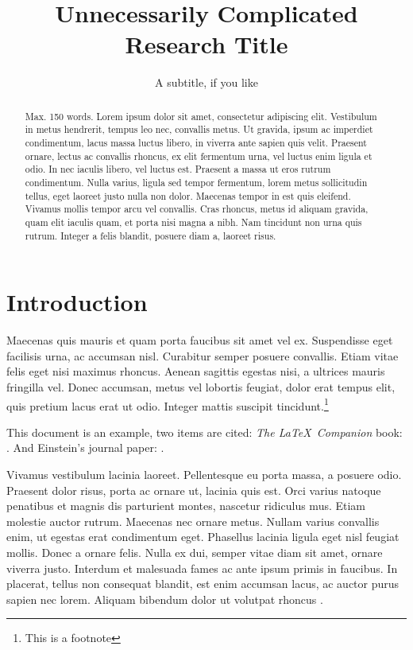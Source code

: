 \documentclass{jcls}
\title{Unnecessarily Complicated Research Title}
\subtitle{A subtitle, if you like}
\begin{document}
\maketitle



\begin{abstract}
  Max. 150 words. Lorem ipsum dolor sit amet, consectetur adipiscing elit. Vestibulum in metus hendrerit, tempus leo nec, convallis metus. Ut gravida, ipsum ac imperdiet condimentum, lacus massa luctus libero, in viverra ante sapien quis velit. Praesent ornare, lectus ac convallis rhoncus, ex elit fermentum urna, vel luctus enim ligula et odio. In nec iaculis libero, vel luctus est. Praesent a massa ut eros rutrum condimentum. Nulla varius, ligula sed tempor fermentum, lorem metus sollicitudin tellus, eget laoreet justo nulla non dolor. Maecenas tempor in est quis eleifend. Vivamus mollis tempor arcu vel convallis. Cras rhoncus, metus id aliquam gravida, quam elit iaculis quam, et porta nisi magna a nibh. Nam tincidunt non urna quis rutrum. Integer a felis blandit, posuere diam a, laoreet risus.
\end{abstract}

\section{Introduction}

Maecenas quis mauris et quam porta faucibus sit amet vel ex. Suspendisse eget facilisis urna, ac accumsan nisl. Curabitur semper posuere convallis. Etiam vitae felis eget nisi maximus rhoncus. Aenean sagittis egestas nisi, a ultrices mauris fringilla vel. Donec accumsan, metus vel lobortis feugiat, dolor erat tempus elit, quis pretium lacus erat ut odio. Integer mattis suscipit tincidunt.\footnote{This is a footnote}

This document is an example, two items are cited: \textit{The \LaTeX\ Companion} book: \cite[see][12-14]{latexcompanion}. And Einstein's journal paper: \cite{einstein}.

Vivamus vestibulum lacinia laoreet. Pellentesque eu porta massa, a posuere odio. Praesent dolor risus, porta ac ornare ut, lacinia quis est. Orci varius natoque penatibus et magnis dis parturient montes, nascetur ridiculus mus. Etiam molestie auctor rutrum. Maecenas nec ornare metus. Nullam varius convallis enim, ut egestas erat condimentum eget. Phasellus lacinia ligula eget nisl feugiat mollis. Donec a ornare felis. Nulla ex dui, semper vitae diam sit amet, ornare viverra justo. Interdum et malesuada fames ac ante ipsum primis in faucibus. In placerat, tellus non consequat blandit, est enim accumsan lacus, ac auctor purus sapien nec lorem. Aliquam bibendum dolor ut volutpat rhoncus .
\end{document}
